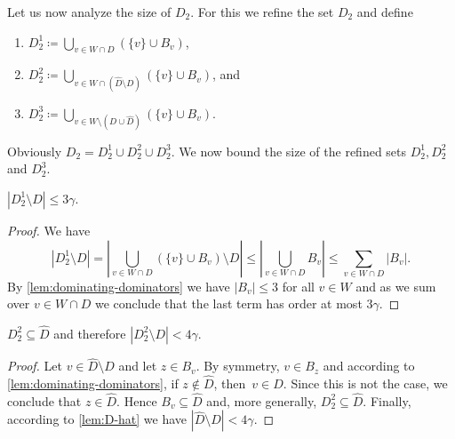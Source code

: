 %


Let us now analyze the size of $D_2$. For this we refine the set $D_2$
and define
\begin{tcolorbox}
  \begin{enumerate}
    \item $D_2^1\coloneqq \bigcup_{v\in W\cap D}
    (\{v\}\cup B_v)$, \smallskip
    \item $D_2^2\coloneqq \bigcup_{v\in W\cap (\hat{D}\setminus D)}
    (\{v\}\cup B_v)$, and \smallskip
    \item $D_2^3\coloneqq \bigcup_{v\in W\setminus (D\cup \hat{D})}
    (\{v\}\cup B_v)$.
  \end{enumerate}
\end{tcolorbox}

\smallskip
Obviously $D_2=D_2^1\cup D_2^2\cup D_2^3$. We now bound the size of the
refined sets $D_2^1,D_2^2$ and $D_2^3$.

\begin{lemma}\label{lem:size-D21}
  $|D_2^1\setminus D|\leq 3\gamma$.
\end{lemma}
\begin{proof}
  We have
  \[|D_2^1\setminus D|= |\bigcup_{v\in W\cap D} (\{v\}\cup
    B_v)\setminus D|\leq |\bigcup_{v\in W\cap D}B_v|\leq \sum_{v\in
      W\cap D}|B_v|.\] By \cref{lem:dominating-dominators} we have
  $|B_v|\leq 3$ for all $v\in W$ and as we sum over $v\in W\cap D$ we
  conclude that the last term has order at most $3\gamma$.
\end{proof}

\begin{lemma}\label{lem:size-D22}
  $D_2^2 \subseteq \hat D$ and therefore
  $|D_2^2\setminus D|< 4\gamma$.
\end{lemma}
\begin{proof}
  Let $v\in \hat{D}\setminus D$ and let $z\in B_v$. By symmetry,
  $v\in B_z$ and according to \cref{lem:dominating-dominators}, if
  $z\not\in \hat{D}$, then~$v\in D$.  Since this is not the case, we
  conclude that $z\in\hat{D}$.  Hence $B_v\subseteq \hat{D}$ and, more
  generally, $D_2^2\subseteq \hat{D}$.  Finally, according to
  \cref{lem:D-hat} we have $|\hat{D}\setminus D|<4\gamma$.
\end{proof}

